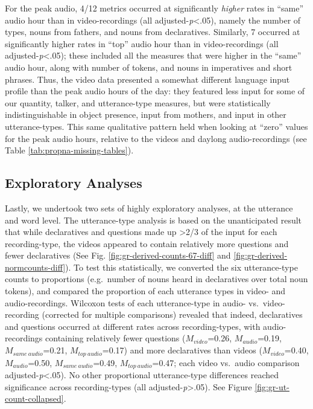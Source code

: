 \documentclass[man]{apa6}
\theoremstyle{definition}
\theoremstyle{definition}
\theoremstyle{definition}
\theoremstyle{remark}
\begin{document}
For the peak audio, 4/12 metrics occurred at significantly \emph{higher}
rates in \enquote{same} audio hour than in video-recordings (all
adjusted-\emph{p}\textless{}.05), namely the number of types, nouns from
fathers, and nouns from declaratives. Similarly, 7 occurred at
significantly higher rates in \enquote{top} audio hour than in
video-recordings (all adjusted-\emph{p}\textless{}.05); these included
all the measures that were higher in the \enquote{same} audio hour,
along with number of tokens, and nouns in imperatives and short phrases.
Thus, the video data presented a somewhat different language input
profile than the peak audio hours of the day: they featured less input
for some of our quantity, talker, and utterance-type measures, but were
statistically indistinguishable in object presence, input from mothers,
and input in other utterance-types. This same qualitative pattern held
when looking at \enquote{zero} values for the peak audio hours, relative
to the videos and daylong audio-recordings (see Table
\ref{tab:propna-missing-tables}).

\subsection{Exploratory Analyses}\label{exploratory-analyses}

Lastly, we undertook two sets of highly exploratory analyses, at the
utterance and word level. The utterance-type analysis is based on the
unanticipated result that while declaratives and questions made up
\textgreater{}2/3 of the input for each recording-type, the videos
appeared to contain relatively more questions and fewer declaratives
(See Fig. \ref{fig:gr-derived-counts-67-diff} and
\ref{fig:gr-derived-normcounts-diff}). To test this statistically, we
converted the six utterance-type counts to proportions (e.g.~number of
nouns heard in declaratives over total noun tokens), and compared the
proportion of each utterance types in video- and audio-recordings.
Wilcoxon tests of each utterance-type in audio- vs.~video-recording
(corrected for multiple comparisons) revealed that indeed, declaratives
and questions occurred at different rates across recording-types, with
audio-recordings containing relatively fewer questions
(\(M_{video}\)=0.26, \(M_{audio}\)=0.19, \(M_{same\  audio}\)=0.21,
\(M_{top\  audio}\)=0.17) and more declaratives than videos
(\(M_{video}\)=0.40, \(M_{audio}\)=0.50, \(M_{same\  audio}\)=0.49,
\(M_{top\ audio}\)=0.47; each video vs.~audio comparison
adjusted-\emph{p}\textless{}.05). No other proportional utterance-type
differences reached significance across recording-types (all
adjusted-\emph{p}\textgreater{}.05). See Figure
\ref{fig:gr-ut-count-collapsed}.
\end{document}
